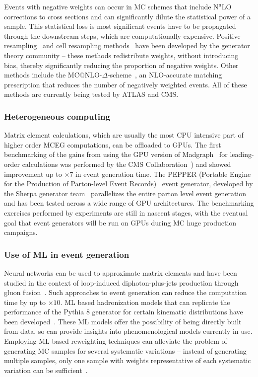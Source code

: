 \documentclass[10pt,a4paper]{article}
\begin{document}
Events with negative weights can occur in MC schemes that include
$\mathrm{N}^\mathrm{n}\mathrm{LO}$ corrections to cross sections and can
significantly dilute the statistical power of a sample. This statistical loss is
most significant events have to be propagated through the downstream steps,
which are computationally expensive. Positive resampling~\cite{Andersen:2020sjs}
and cell resampling methods~\cite{Andersen:2021mvw} have been developed by the
generator theory community -- these methods redistribute weights, without
introducing bias, thereby significantly reducing the proportion of negative
weights. Other methods include the
MC@NLO-$\Delta$-scheme~\cite{Frederix:2020trv}, an NLO-accurate matching
prescription that reduces the number of negatively weighted events. All of these
methods are currently being tested by ATLAS and CMS.

\subsubsection{Heterogeneous computing}\label{heterogeneous-computing}

Matrix element calculations, which are usually the most CPU intensive part of
higher order MCEG computations, can be offloaded to GPUs. The first benchmarking
of the gains from using the GPU version of
Madgraph~\cite{Alwall:2014hca, Hageboeck:2023blb, Valassi:2022dkc, Wettersten:2023ekm}
for leading-order calculations was
performed by the CMS Collaboration~\cite{CMS-DP-2024-086}) and showed
improvement up to $\times 7$ in event generation time. The PEPPER (Portable
Engine for the Production of Parton-level Event Records)~\cite{Bothmann:2023gew}
event generator, developed by the Sherpa generator team~\cite{Sherpa:2019gpd}
parallelizes the entire parton level event generation and has been tested across
a wide range of GPU architectures. The benchmarking exercises performed by
experiments are still in nascent stages, with the eventual goal that event
generators will be run on GPUs during MC huge production campaigns.

\subsubsection{Use of ML in event generation}
\label{use-of-ml-in-event-generation}

Neural networks can be used to approximate matrix elements and have been studied
in the context of loop-induced diphoton-plus-jets production through gluon
fusion~\cite{Moodie:2022flt}. Such approaches to event generation can reduce the
computation time by up to $\times 10$. ML based hadronization models that can
replicate the performance of the Pythia 8 generator for certain kinematic
distributions have been developed~\cite{Ilten:2022jfm, Bierlich:2023fmh}. These
ML models offer the possibility of being directly built from data, so can
provide insights into phenomenological models currently in use. Employing ML
based reweighting techniques can alleviate the problem of generating MC samples
for several systematic variations -- instead of generating multiple samples,
only one sample with weights representative of each systematic variation can be
sufficient~\cite{CMS:2024jdl}.
\end{document}
